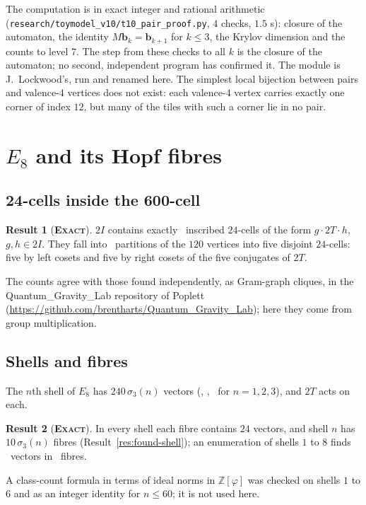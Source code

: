 \documentclass[11pt]{article}
\newcommand{\exact}{\textbf{\textsc{Exact}}}
\theoremstyle{definition}
\newtheorem{result}{Result}
\begin{document}
The computation is in exact integer and rational arithmetic (\texttt{research/toymodel\_v10/t10\_pair\_proof.py}, $4$ checks, $1.5$ s): closure of the automaton, the identity $M\mathbf b_k=\mathbf b_{k+1}$ for $k\le3$, the Krylov dimension and the counts to level $7$. The step from these checks to all $k$ is the closure of the automaton; no second, independent program has confirmed it. The module is J.~Lockwood's, run and renamed here.
The simplest local bijection between pairs and valence-$4$ vertices does not exist: each valence-$4$ vertex carries exactly one corner of index $12$, but many of the tiles with such a corner lie in no pair.


\section{\texorpdfstring{$E_8$}{E8} and its Hopf fibres}\label{sec:e8}
\subsection{24-cells inside the 600-cell}\label{sec:cells}
\begin{result}[\exact]\label{res:cells}
$2I$ contains exactly \qgInscribed\ inscribed $24$-cells of the form $g\cdot 2T\cdot h$, $g,h\in2I$. They fall into \qgPartitions\ partitions of the $120$ vertices into five disjoint $24$-cells: five by left cosets and five by right cosets of the five conjugates of $2T$.
\end{result}
The counts agree with those found independently, as Gram-graph cliques, in the Quantum\_Gravity\_Lab repository of Poplett (\url{https://github.com/brentharts/Quantum_Gravity_Lab}); here they come from group multiplication.

\subsection{Shells and fibres}\label{sec:shells}
The $n$th shell of $E_8$ has $240\,\sigma_3(n)$ vectors (\qgShellOne, \qgShellTwo, \qgShellThree\ for $n=1,2,3$), and $2T$ acts on each.
\begin{result}[\exact]\label{res:shells}
In every shell each fibre contains $24$ vectors, and shell $n$ has $10\,\sigma_3(n)$ fibres (Result~\ref{res:found-shell}); an enumeration of shells $1$ to $8$ finds \qgVecEight\ vectors in \qgFibreEight\ fibres.
\end{result}
A class-count formula in terms of ideal norms in $\mathbb{Z}[\varphi]$ was checked on shells $1$ to $6$ and as an integer identity for $n\le60$; it is not used here.
\end{document}
